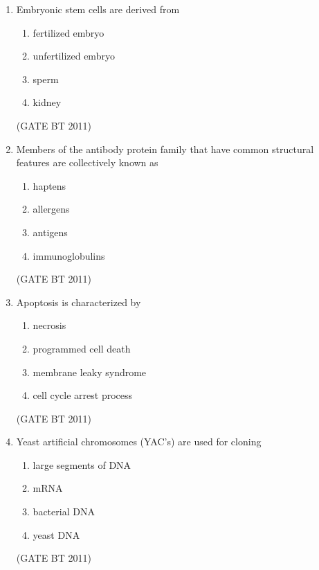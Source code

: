 \documentclass[journal,12pt,onecolumn]{IEEEtran}
\begin{document}
\begin{enumerate}

    \item Embryonic stem cells are derived from
    \begin{multicols}{2}
    \begin{enumerate}
        \item fertilized embryo
        \item unfertilized embryo
        \item sperm
        \item kidney
    \end{enumerate}
    \end{multicols} \hfill(GATE BT 2011)

    \item Members of the antibody protein family that have common structural features are collectively known as
    \begin{multicols}{2}
    \begin{enumerate}
        \item haptens
        \item allergens
        \item antigens
        \item immunoglobulins
    \end{enumerate}
    \end{multicols} \hfill(GATE BT 2011)

    \item Apoptosis is characterized by
    \begin{multicols}{2}
    \begin{enumerate}
        \item necrosis
        \item programmed cell death
        \item membrane leaky syndrome
        \item cell cycle arrest process
    \end{enumerate}
    \end{multicols} \hfill(GATE BT 2011)

    \item Yeast artificial chromosomes (YAC’s) are used for cloning
    \begin{multicols}{2}
    \begin{enumerate}
        \item large segments of DNA
        \item mRNA
        \item bacterial DNA
        \item yeast DNA
    \end{enumerate}
    \end{multicols} \hfill(GATE BT 2011)


\end{enumerate}
\end{document}
